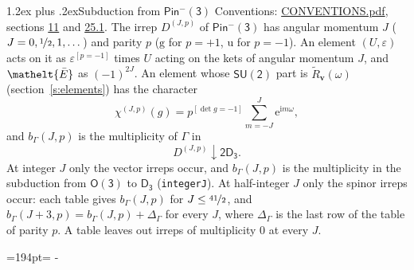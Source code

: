 \documentclass[10pt,a4paper]{article}
\makeatletter
\renewcommand\section{\@startsection{section}{1}{\z@}{-3ex plus -1ex minus -.2ex}%
  {1.2ex plus .2ex}{\normalfont\large\sffamily\bfseries\color{parttitle}}}
\newcommand{\needspace}[1]{\par\penalty-100\begingroup\dimen0=#1\relax\dimen2=\pagegoal
  \advance\dimen2-\pagetotal\ifdim\dimen0>\dimen2\relax\ifdim\dimen2>0pt\vfil\break\fi\fi
  \endgroup}
\numberwithin{equation}{section}
\newcommand{\eltfont}[1]{{\let\sigma\eltsigma\mathelt{#1}}}
\newcommand{\grp}[1]{\mathsf{#1}}
\newcommand{\elt}[1]{\eltfont{#1}}
\newcommand{\ptag}[1]{\mathrm{#1}}
\newcommand{\iverson}[1]{[#1]}
\newcommand{\restr}[2]{#1\!\downarrow#2}
\newcommand{\vv}{\mathbf{v}}
\newcommand{\iunit}{\mathrm{i}}
\newcommand{\expe}{\mathrm{e}}
\newcommand{\irrJp}[2]{D^{(#1,#2)}}
\newcommand{\barred}[1]{\bar{#1}}
\newcommand{\lift}[1]{\tilde{#1}}
\makeatother
\begin{document}
\section{Subduction from \texorpdfstring{$\grp{Pin^{-}(3)}$}{Pin(3)}}\label{s:subduction_parent}
Conventions: \href{../../CONVENTIONS.pdf}{CONVENTIONS.pdf}, sections \href{../../../rotation/CONVENTIONS.pdf\#conv.11}{11} and \href{../../CONVENTIONS.pdf\#conv.25.1}{25.1}.
\leavevmode\label{n:index.J}\label{n:index.parity}\label{n:irrep.o3}The irrep $\irrJp{J}{p}$ of \href{Pinminus3.pdf}{$\grp{Pin^{-}(3)}$} has angular momentum $J$ ($J = 0, \nicefrac{1}{2}, 1, \dots$) and parity $p$ ($\ptag{g}$ for $p = +1$, $\ptag{u}$ for $p = -1$). An element $(U, \varepsilon)$ acts on it as $\varepsilon^{[p = -1]}$ times $U$ acting on the kets of angular momentum $J$, and $\elt{\barred{E}}$ as $(-1)^{2J}$. \label{n:function.character.parent}\label{n:function.multiplicity}An element whose $\grp{SU(2)}$ part is $\lift{R}_{\vv}(\omega)$ (section~\ref{s:elements}) has the character
\begin{equation}\label{e:chi}\chi^{(J,p)}(g) = p^{\iverson{\det g = -1}}\sum_{m=-J}^{J} \expe^{\iunit m\omega},\end{equation}
and $b_\Gamma(J, p)$ is the multiplicity of $\Gamma$ in
\begin{equation}\label{e:parent}\restr{\irrJp{J}{p}}{\grp{2D_{3}}}.\end{equation}
At integer $J$ only the vector irreps occur, and $b_\Gamma(J, p)$ is the multiplicity in the subduction from $\grp{O(3)}$ to \href{../../../rotation/data/pdf/D3.pdf}{$\grp{D_{3}}$} (\texttt{integerJ}). \label{n:index.increment}At half-integer $J$ only the spinor irreps occur: each table gives $b_\Gamma(J, p)$ for $J \le \nicefrac{41}{2}$, and $b_\Gamma(J + 3, p) = b_\Gamma(J, p) + \Delta_\Gamma$ for every $J$, where $\Delta_\Gamma$ is the last row of the table of parity $p$. A table leaves out irreps of multiplicity 0 at every $J$.
\needspace{194pt}
\end{document}
